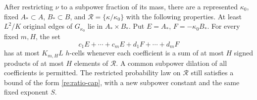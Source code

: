 \begin{lemma}\label{re:common-sets}
After restricting \(\nu\) to a subpower fraction of its mass, there
are a represented \(\kappa_0\), fixed \(A_*\subset A\), \(B_*\subset B\),
and \(\mathcal R=\{\kappa/\kappa_0\}\) with the following properties.
At least \(L^2/K\) original edges of \(G_{\kappa_0}\) lie in
\(A_*\times B_*\).  Put \(E=A_*\), \(F=-\kappa_0B_*\).
For every fixed \(m,H\), the set
\begin{equation}\label{re:scalar-support}
 c_1E+\cdots+c_mE+d_1F+\cdots+d_mF
\end{equation}
has at most \(K_{m,H}L\) \(h\)-cells whenever each coefficient is a
sum of at most \(H\) signed products of at most \(H\) elements of
\(\mathcal R\).  A common subpower dilation of all coefficients is
permitted.  The restricted probability law on \(\mathcal R\) still
satisfies a bound of the form \eqref{re:ratio-cap}, with a new
subpower constant and the same fixed exponent \(S\).
\end{lemma}

